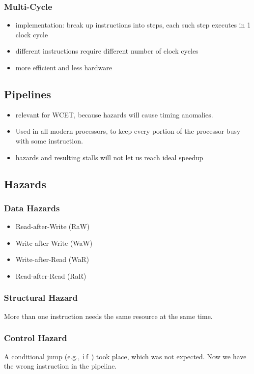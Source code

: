 \documentclass[fs, footer]{latex4ei}
\begin{document}
\begin{multicols*}{4}
{\subsubsection{Multi-Cycle}
\begin{itemize}
\item implementation: break up instructions into steps, each such step executes in 1 clock cycle
\item different instructions require different number of clock cycles
\item more efficient and less hardware
\end{itemize}

\subsection{Pipelines}
\begin{itemize}
\item relevant for WCET, because hazards will cause timing anomalies.
\item Used in all modern processors, to keep every portion of the processor busy with some instruction.
\item hazards and resulting stalls will not let us reach ideal speedup
\end{itemize}

\subsection{Hazards}
\subsubsection{Data Hazards}
\begin{itemize}
\item Read-after-Write (RaW)
\item Write-after-Write (WaW)
\item Write-after-Read (WaR)
\item Read-after-Read (RaR)
\end{itemize}

\subsubsection{Structural Hazard}
More than one instruction needs the same resource at the same time.

\subsubsection{Control Hazard}
A conditional jump (e.g., \texttt{if} ) took place, which was not expected. Now we have the wrong instruction in the pipeline.

}
\end{multicols*}
\end{document}
